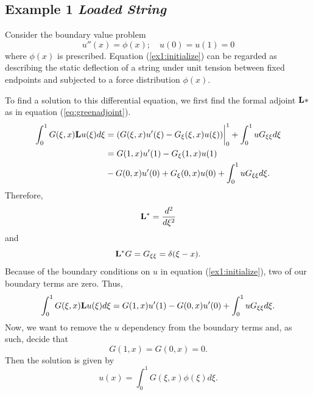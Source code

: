 \subsection{Example 1 \textit{ Loaded String}}
    
    Consider the boundary value problem
    \begin{equation} \label{ex1:initialize}
        u''(x) = \phi(x);\quad u(0)=u(1)=0
    \end{equation}
    where \(\phi(x)\) is prescribed. Equation (\ref{ex1:initialize}) can be regarded as describing the static deflection of a string under unit tension between fixed endpoints and subjected to a force distribution \(\phi(x)\).

    
    
    To find a solution to this differential equation, we first find the formal adjoint \(\mathrm{\bf{L}}*\) as in equation (\ref{eq:greenadjoint}). 
    \begin{equation}
        \begin{split}
            \int_{0}^{1} G(\xi, x)\mathrm{\bf{L}} u(\xi) d\xi  &= (G(\xi, x)u'(\xi)-G_\xi (\xi, x)u(\xi))\biggr\rvert_0^1 + \int_{0}^{1} uG_{\xi\xi}d\xi\\
            &= G(1, x)u'(1) - G_\xi(1, x)u(1) \\&- G(0, x)u'(0) + G_\xi(0,x)u(0) + \int_{0}^{1} uG_{\xi\xi}d\xi.
        \end{split}
    \end{equation}
    Therefore, 
    \begin{equation}
        \mathrm{\bf{L^*}} = \frac{d^2}{d\xi^2}
    \end{equation}
    and 
    \begin{equation}\label{eq:loadedStringLstarG}
        \mathrm{\bf{L^*}} G = G_{\xi\xi} = \delta(\xi-x).
    \end{equation}
    Because of the boundary conditions on \(u\) in equation (\ref{ex1:initialize}), two of our boundary terms are zero. Thus,
    \begin{equation}
        \int_{0}^{1} G(\xi, x)\mathrm{\bf{L}} u(\xi) d\xi = G(1, x)u'(1) - G(0, x)u'(0) + \int_{0}^{1} uG_{\xi\xi}d\xi.
    \end{equation}
    Now, we want to remove the \(u\) dependency from the boundary terms and, as such, decide that
    \begin{equation}
        G(1,x) = G(0,x) = 0.
    \end{equation}
    Then the solution is given by 
    \begin{equation}\label{eq:loadSln}
        u(x) = \int_0^1 G(\xi,x)\phi(\xi)d\xi.
    \end{equation}

